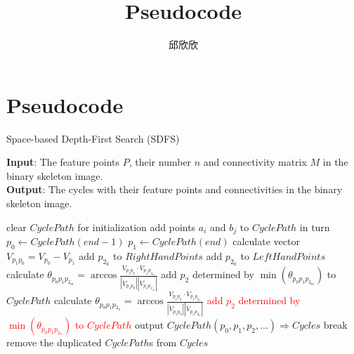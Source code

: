 \documentclass[12pt]{article}
\begin{document}
\title{\vspace{-2em}Pseudocode\vspace{-0.7em}}
\author{邱欣欣}
\maketitle\thispagestyle{fancy}

\section{Pseudocode}
\begin{algorithm}[!ht]
\caption{Space-based Depth-First Search (SDFS)}\label{alg:sdfs}
\textbf{Input}: The feature points $P$, their number $n$ and connectivity matrix $M$ in the binary skeleton image.\\
\textbf{Output}: The cycles with their feature points and connectivities in the binary skeleton image.
\begin{algorithmic}[1]
\STATE clear $CyclePath$ for initialization
\STATE add points $a_i$ and $b_j$ to $CyclePath$ in turn
\STATE $p_0\leftarrow CyclePath(end-1)$
\STATE $p_1\leftarrow CyclePath(end)$
\STATE calculate vector $V_{p_1p_0}=V_{p_0}-V_{p_1}$
\STATE add $p_{2_k}$ to $RightHandPoints$
\ELSE
\STATE add $p_{2_k}$ to $LeftHandPoints$
\ENDIF
\ENDFOR
{}
\STATE calculate $\theta_{p_0p_1p_{2_m}}=\arccos{\frac{V_{p_1p_0}\cdot V_{p_1p_{2_m}}}{\left|V_{p_1p_0}\right|\left|V_{p_1p_{2_m}}\right|}}$
\ENDFOR
\STATE add $p_2$ determined by $\min{\left(\theta_{p_0p_1p_{2_m}}\right)}$ to $CyclePath$
\ELSE
{}
\STATE calculate $\theta_{p_0p_1p_{2_n}}=\arccos{\frac{V_{p_1p_0}\cdot V_{p_1p_{2_n}}}{\left|V_{p_1p_0}\right|\left|V_{p_1p_{2_n}}\right|}}$
\ENDFOR
\STATE \textcolor{red}{add $p_2$ determined by $\min{\left(\theta_{p_0p_1p_{2_n}}\right)}$ to $CyclePath$}
\ENDIF
{}
\IF {\textcolor{red}{$checkCyclePath(p_0,p_1,p_2,...)$}}
\STATE output $CyclePath(p_0,p_1,p_2,...) \Rightarrow Cycles$
\STATE break
\ENDIF
\ENDIF
\ENDWHILE
\ENDFOR  
\ENDFOR
\STATE remove the duplicated $CyclePath$s from $Cycles$
\end{algorithmic}
\end{algorithm}


\end{document}
